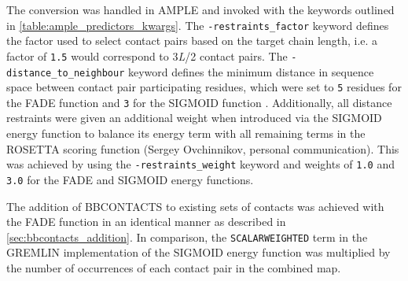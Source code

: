 The conversion was handled in AMPLE and invoked with the keywords outlined in \cref{table:ample_predictors_kwargs}. The \texttt{-restraints\_factor} keyword defines the factor used to select contact pairs based on the target chain length, i.e. a factor of \texttt{1.5} would correspond to 3\textit{L}/2 contact pairs. The \texttt{-distance\_to\_neighbour} keyword defines the minimum distance in sequence space between contact pair participating residues, which were set to \texttt{5} residues for the FADE function \cite{Michel2014-eg} and \texttt{3} for the SIGMOID function \cite{Ovchinnikov2015-tn}. Additionally, all distance restraints were given an additional weight when introduced via the SIGMOID energy function to balance its energy term with all remaining terms in the ROSETTA scoring function (Sergey Ovchinnikov, personal communication). This was achieved by using the \texttt{-restraints\_weight} keyword and weights of \texttt{1.0} and \texttt{3.0} for the FADE and SIGMOID energy functions.

The addition of BBCONTACTS to existing sets of contacts was achieved with the FADE function in an identical manner as described in \cref{sec:bbcontacts_addition}. In comparison, the \texttt{SCALARWEIGHTED} term in the GREMLIN implementation of the SIGMOID energy function \cite{Ovchinnikov2015-tn} was multiplied by the number of occurrences of each contact pair in the combined map.

